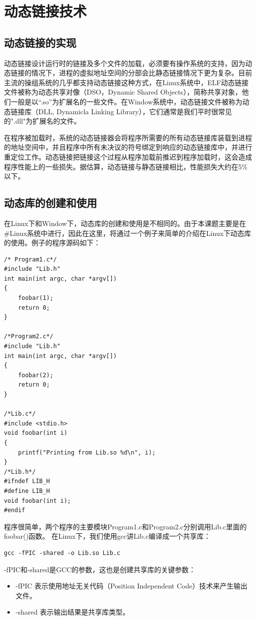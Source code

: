 \documentclass[twoside, xetex]{report}
\begin{document}
\section{动态链接技术}
	\subsection{动态链接的实现}
	动态链接设计运行时的链接及多个文件的加载，必须要有操作系统的支持，因为动态链接的情况下，进程的虚拟地址空间的分部会比静态链接情况下更为复杂。目前主流的操组系统的几乎都支持动态链接这种方式，在Linux系统中，ELF动态链接文件被称为动态共享对像（DSO，Dynamic Shared Objects），简称共享对象，他们一般是以“.so”为扩展名的一些文件。在Window系统中，动态链接文件被称为动态链接库（DLL, Dynamicla Linking Library），它们通常是我们平时很常见的".dll"为扩展名的文件。
	
	在程序被加载时，系统的动态链接器会将程序所需要的所有动态链接库装载到进程的地址空间中，并且程序中所有未决议的符号绑定到响应的动态链接库中，并进行重定位工作。动态链接把链接这个过程从程序加载前推迟到程序加载时，这会造成程序性能上的一些损失。据估算，动态链接与静态链接相比，性能损失大约在5\%以下。
	
	\subsection{动态库的创建和使用}
	在Linux下和Window下，动态库的创建和使用是不相同的。由于本课题主要是在\#Linux系统中进行，因此在这里，将通过一个例子来简单的介绍在Linux下动态库的使用。例子的程序源码如下：
	\begin{lstlisting}
/* Program1.c*/
#include "Lib.h"
int main(int argc, char *argv[])
{
	foobar(1);
	return 0;
}
	
/*Program2.c*/
#include "Lib.h"
int main(int argc, char *argv[])
{
	foobar(2);
	return 0;
}
	
/*Lib.c*/
#include <stdio.h>
void foobar(int i)
{
	printf("Printing from Lib.so %d\n", i);
}
/*Lib.h*/
#ifndef LIB_H
#define LIB_H
void foobar(int i);
#endif
	\end{lstlisting}
	程序很简单，两个程序的主要模块Program1.c和Program2.c分别调用Lib.c里面的foobar()函数。
	在Linux下，我们使用gcc讲Lib.c编译成一个共享库：
\begin{lstlisting}
gcc -fPIC -shared -o Lib.so Lib.c
\end{lstlisting}
	-fPIC和-shared是GCC的参数，这也是创建共享库的关键参数：
	\begin{itemize}
		\item -fPIC 表示使用地址无关代码（Position Independent Code）技术来产生输出文件。
		\item -shared 表示输出结果是共享库类型。
	\end{itemize}
	
\end{document}
